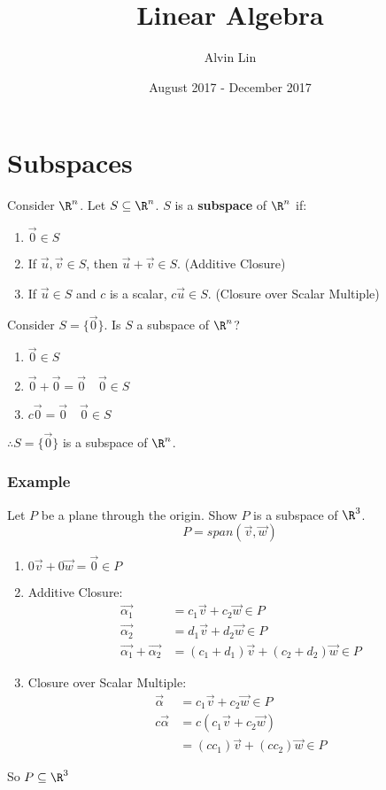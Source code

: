 \documentclass{math}
\title{Linear Algebra}
\author{Alvin Lin}
\date{August 2017 - December 2017}
\begin{document}
\maketitle

\section*{Subspaces}
Consider \( \R^n \). Let \( S\subseteq\R^n \). \( S \) is a \textbf{subspace}
of \( \R^n \) if:
\begin{enumerate}
  \item \( \vec{0}\in S \)
  \item If \( \vec{u},\vec{v}\in S \), then \( \vec{u}+\vec{v}\in S \).
  (Additive Closure)
  \item If \( \vec{u}\in S \) and \( c \) is a scalar, \( c\vec{u}\in S \).
  (Closure over Scalar Multiple)
\end{enumerate}
Consider \( S = \{\vec{0}\} \). Is \( S \) a subspace of \( \R^n \)?
\begin{enumerate}
  \item \( \vec{0}\in S \)
  \item \( \vec{0}+\vec{0} = \vec{0} \quad \vec{0}\in S \)
  \item \( c\vec{0} = \vec{0} \quad \vec{0}\in S \)
\end{enumerate}
\( \therefore S = \{\vec{0}\} \) is a subspace of \( \R^n \).

\subsubsection*{Example}
Let \( P \) be a plane through the origin. Show \( P \) is a subspace of
\( \R^3 \).
\[ P = span(\vec{v},\vec{w}) \]
\begin{enumerate}
  \item \( 0\vec{v}+0\vec{w} = \vec{0}\in P \)
  \item Additive Closure:
  \begin{align*}
    \vec{\alpha_1} &= c_1\vec{v}+c_2\vec{w}\in P \\
    \vec{\alpha_2} &= d_1\vec{v}+d_2\vec{w}\in P \\
    \vec{\alpha_1}+\vec{\alpha_2} &= (c_1+d_1)\vec{v}+(c_2+d_2)\vec{w}\in P
  \end{align*}
  \item Closure over Scalar Multiple:
  \begin{align*}
    \vec{\alpha} &= c_1\vec{v}+c_2\vec{w}\in P \\
    c\vec{\alpha} &= c(c_1\vec{v}+c_2\vec{w}) \\
    &= (cc_1)\vec{v}+(cc_2)\vec{w}\in P
  \end{align*}
\end{enumerate}
So \( P\subseteq\R^3 \)
\end{document}
